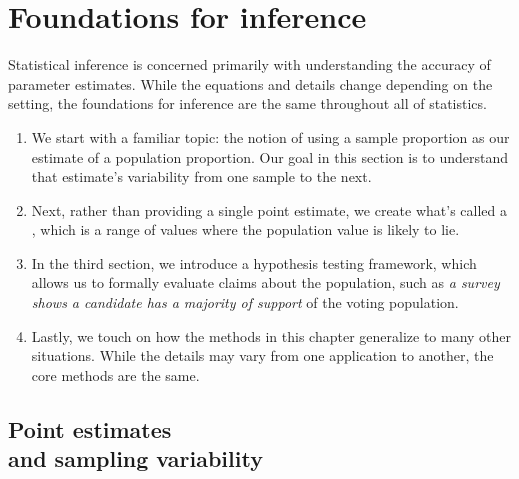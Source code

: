 \chapter{Foundations for inference}
\label{foundationsForInference}

Statistical inference is concerned primarily with understanding the
accuracy of parameter estimates. While the equations and details change
depending on the setting, the foundations for inference are the same
throughout all of statistics.
\begin{enumerate}
\item[\ref{pointEstimates}] We start with a familiar topic:
    the notion of using a sample proportion as our estimate
    of a population proportion. Our goal in this section
    is to understand that estimate's variability from one
    sample to the next.
\item[\ref{confidenceIntervals}] Next, rather than providing
    a single point estimate, we create what's called a
    , which is a range
    of values where the population value is likely to lie.
\item[\ref{hypothesisTesting}] In the third section,
    we introduce a hypothesis testing framework, which allows
    us to formally evaluate claims about the population,
    such as \emph{a survey shows a candidate has a majority
    of support} of the voting population.
\item[\ref{aFrameworkForInference}] Lastly, we touch on how
    the methods in this chapter generalize to many other
    situations. While the details may vary from one
    application to another, the core methods are the same.
\end{enumerate}









\section[Point estimates and sampling variability]
    {Point estimates \\ and sampling variability}
\label{pointEstimates}

